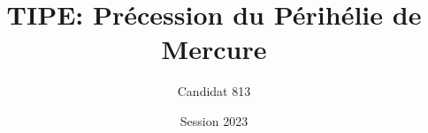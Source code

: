 






\title[TIPE Mercure]{TIPE: Précession du Périhélie de Mercure}
\author[813]{Candidat 813} %
\date{Session 2023}













\appendix








